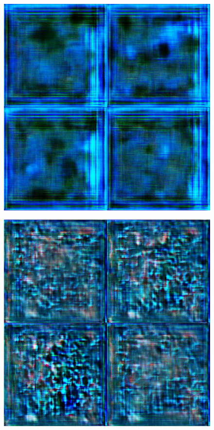 \begin{figure}[H]
\begin{minipage}{0.24\columnwidth}
		\includegraphics[clip, width=\linewidth]{fig/generative_adversarial_nets/0079_0000}
		\label{fig:}
	\end{minipage}
	\begin{minipage}{0.24\columnwidth}
		\centering
		\includegraphics[clip, width=\linewidth]{fig/generative_adversarial_nets/0641_0000}

\end{minipage}
\end{figure}
